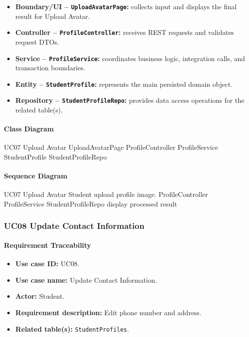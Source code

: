 \begin{itemize}
    \item \textbf{Boundary/UI -- \texttt{UploadAvatarPage}:} collects input and displays the final result for Upload Avatar.
    \item \textbf{Controller -- \texttt{ProfileController}:} receives REST requests and validates request DTOs.
    \item \textbf{Service -- \texttt{ProfileService}:} coordinates business logic, integration calls, and transaction boundaries.
    \item \textbf{Entity -- \texttt{StudentProfile}:} represents the main persisted domain object.
    \item \textbf{Repository -- \texttt{StudentProfileRepo}:} provides data access operations for the related table(s).
\end{itemize}

\paragraph{Class Diagram}

\ClassDiagram
{UC07 Upload Avatar}
{UploadAvatarPage}
{ProfileController}
{ProfileService}
{StudentProfile}
{StudentProfileRepo}

\paragraph{Sequence Diagram}

\SequenceDiagram
{UC07 Upload Avatar}
{Student}
{upload profile image.}
{ProfileController}
{ProfileService}
{StudentProfileRepo}
{display processed result}

\subsubsection{UC08 Update Contact Information}

\paragraph{Requirement Traceability}

\begin{itemize}
    \item \textbf{Use case ID:} UC08.
    \item \textbf{Use case name:} Update Contact Information.
    \item \textbf{Actor:} Student.
    \item \textbf{Requirement description:} Edit phone number and address.
    \item \textbf{Related table(s):} \texttt{StudentProfiles}.
\end{itemize}

